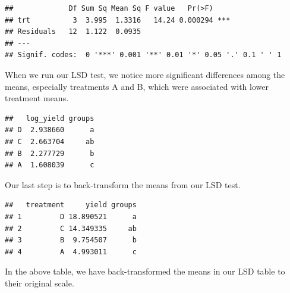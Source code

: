 \documentclass[
]{book}
\newenvironment{Shaded}{\begin{snugshade}}{\end{snugshade}}
\newcommand{\AttributeTok}[1]{\textcolor[rgb]{0.77,0.63,0.00}{#1}}
\newcommand{\FunctionTok}[1]{\textcolor[rgb]{0.00,0.00,0.00}{#1}}
\newcommand{\NormalTok}[1]{#1}
\newcommand{\OtherTok}[1]{\textcolor[rgb]{0.56,0.35,0.01}{#1}}
\newcommand{\SpecialCharTok}[1]{\textcolor[rgb]{0.00,0.00,0.00}{#1}}
\newcommand{\StringTok}[1]{\textcolor[rgb]{0.31,0.60,0.02}{#1}}
\begin{document}
\begin{verbatim}
##             Df Sum Sq Mean Sq F value   Pr(>F)    
## trt          3  3.995  1.3316   14.24 0.000294 ***
## Residuals   12  1.122  0.0935                     
## ---
## Signif. codes:  0 '***' 0.001 '**' 0.01 '*' 0.05 '.' 0.1 ' ' 1
\end{verbatim}

When we run our LSD test, we notice more significant differences among the means, especially treatments A and B, which were associated with lower treatment means.

\begin{Shaded}
\end{Shaded}

\begin{verbatim}
##   log_yield groups
## D  2.938660      a
## C  2.663704     ab
## B  2.277729      b
## A  1.608039      c
\end{verbatim}

Our last step is to back-transform the means from our LSD test.

\begin{Shaded}
\end{Shaded}

\begin{verbatim}
##   treatment     yield groups
## 1         D 18.890521      a
## 2         C 14.349335     ab
## 3         B  9.754507      b
## 4         A  4.993011      c
\end{verbatim}

In the above table, we have back-transformed the means in our LSD table to their original scale.
\end{document}
